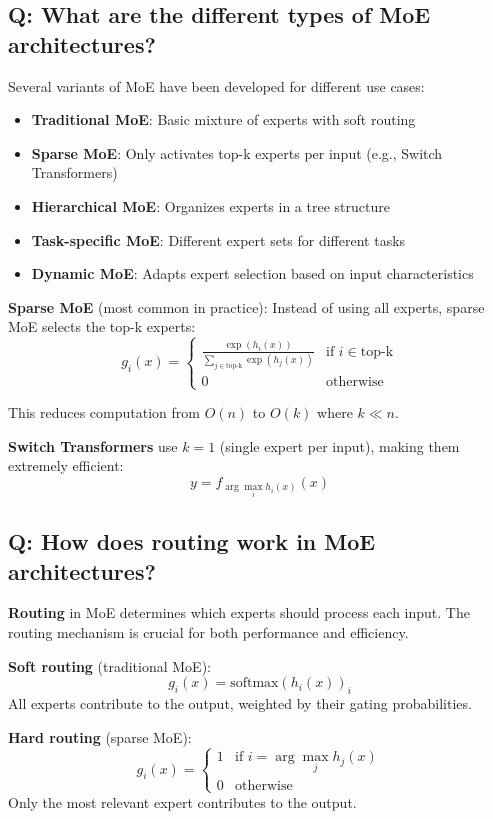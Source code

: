 \subsection*{Q: What are the different types of MoE architectures?}
Several variants of MoE have been developed for different use cases:

\begin{itemize}
	\item \textbf{Traditional MoE}: Basic mixture of experts with soft routing
	\item \textbf{Sparse MoE}: Only activates top-k experts per input (e.g., Switch Transformers)
	\item \textbf{Hierarchical MoE}: Organizes experts in a tree structure
	\item \textbf{Task-specific MoE}: Different expert sets for different tasks
	\item \textbf{Dynamic MoE}: Adapts expert selection based on input characteristics
\end{itemize}

\textbf{Sparse MoE} (most common in practice):
Instead of using all experts, sparse MoE selects the top-k experts:
\[
g_i(x) = \begin{cases}
\frac{\exp(h_i(x))}{\sum_{j \in \text{top-k}} \exp(h_j(x))} & \text{if } i \in \text{top-k} \\
0 & \text{otherwise}
\end{cases}
\]

This reduces computation from \(O(n)\) to \(O(k)\) where \(k \ll n\).

\textbf{Switch Transformers} use \(k=1\) (single expert per input), making them extremely efficient:
\[
y = f_{\arg\max_i h_i(x)}(x)
\]

\subsection*{Q: How does routing work in MoE architectures?}
\textbf{Routing} in MoE determines which experts should process each input. The routing mechanism is crucial for both performance and efficiency.

\textbf{Soft routing} (traditional MoE):
\[
g_i(x) = \text{softmax}(h_i(x))_i
\]
All experts contribute to the output, weighted by their gating probabilities.

\textbf{Hard routing} (sparse MoE):
\[
g_i(x) = \begin{cases}
1 & \text{if } i = \arg\max_j h_j(x) \\
0 & \text{otherwise}
\end{cases}
\]
Only the most relevant expert contributes to the output.

